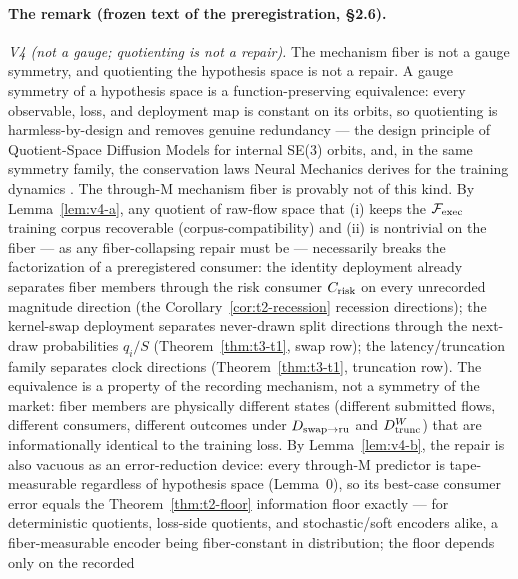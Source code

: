 
\paragraph{The remark (frozen text of the preregistration, \S2.6).}

\emph{V4 (not a gauge; quotienting is not a repair).} The mechanism fiber is
not a gauge symmetry, and quotienting the hypothesis space is not a repair.
A gauge symmetry of a hypothesis space is a function-preserving equivalence:
every observable, loss, and deployment map is constant on its orbits, so
quotienting is harmless-by-design and removes genuine redundancy --- the
design principle of Quotient-Space Diffusion Models \citep{quotientdiffusion2026}
for internal SE(3) orbits, and, in the same symmetry family, the
conservation laws Neural Mechanics derives for the training dynamics
\citep{neuralmechanics2020}. The through-M mechanism fiber
is provably not of this kind. By Lemma~\ref{lem:v4-a}, any quotient of
raw-flow space that (i) keeps the $\Fexec$ training corpus recoverable
(corpus-compatibility) and (ii) is nontrivial on the fiber --- as any
fiber-collapsing repair must be --- necessarily breaks the factorization of
a preregistered consumer: the identity deployment already separates fiber
members through the risk consumer $\Crisk$ on every unrecorded magnitude
direction (the Corollary~\ref{cor:t2-recession} recession directions); the
kernel-swap deployment separates never-drawn split directions through the
next-draw probabilities $q_i/S$ (Theorem~\ref{thm:t3-t1}, swap row); the
latency/truncation family separates clock directions
(Theorem~\ref{thm:t3-t1}, truncation row). The equivalence is a property of
the recording mechanism, not a symmetry of the market: fiber members are
physically different states (different submitted flows, different
consumers, different outcomes under $\Dswapru$ and $\Dtrunc[W]$) that are
informationally identical to the training loss. By Lemma~\ref{lem:v4-b}, the
repair is also vacuous as an error-reduction device: every through-M
predictor is tape-measurable regardless of hypothesis space (Lemma~0), so
its best-case consumer error equals the Theorem~\ref{thm:t2-floor}
information floor exactly --- for deterministic quotients, loss-side
quotients, and stochastic/soft encoders alike, a fiber-measurable encoder
being fiber-constant in distribution; the floor depends only on the recorded
